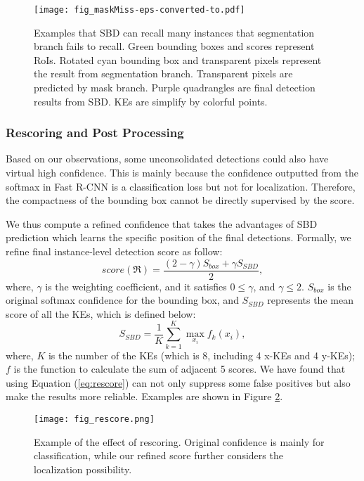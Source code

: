 \documentclass{article}
\begin{document}
\begin{figure}[!t]
  \centering
  \centerline{\texttt{[image: fig\_maskMiss-eps-converted-to.pdf]}}
  \caption{Examples that SBD can recall many instances that segmentation branch fails to recall. Green bounding boxes and scores represent RoIs. Rotated cyan bounding box and transparent pixels represent the result from segmentation branch. Transparent pixels are predicted by mask branch. Purple quadrangles are final detection results from SBD. KEs are simplify by colorful points.}\label{fig:maskMiss}
\end{figure}

\subsubsection{Rescoring and Post Processing}

Based on our observations, some unconsolidated detections could also have virtual high confidence. This is mainly because the confidence outputted from the softmax in Fast R-CNN \cite{girshick2015fast} is a classification loss but not for localization. Therefore, the compactness of the bounding box cannot be directly supervised by the score.

We thus compute a refined confidence that takes the advantages of SBD prediction which learns the specific position of the final detections. Formally, we refine final instance-level detection score as follow:
\begin{equation}\label{eq:rescore}
  score(\Re) = \frac{(2-\gamma)S_{box} + \gamma S_{SBD}}{2},
\end{equation}
where, $\gamma$ is the weighting coefficient, and it satisfies $0\leq\gamma$, and $\gamma\leq2$. $S_{box}$ is the original softmax confidence for the bounding box, and $S_{SBD}$ represents the mean score of all the KEs, which is defined below: 
\begin{equation}\label{eq:sKE}
  S_{SBD} = \frac{1}{K}\sum_{k=1}^{K}\max_{x_{i}}f_{k}(x_{i}),
\end{equation}
where, $K$ is the number of the KEs (which is 8, including 4 x-KEs and 4 y-KEs); $f$ is the function to calculate the sum of adjacent 5 scores. We have found that using Equation (\ref{eq:rescore}) can not only suppress some false positives but also make the results more reliable. Examples are shown in Figure \ref{fig:rescore}.
\begin{figure}[!t]
  \centering
  \centerline{\texttt{[image: fig\_rescore.png]}}
  \caption{Example of the effect of rescoring. Original confidence is mainly for classification, while our refined score further considers the localization possibility.}\label{fig:rescore}
\end{figure}
\end{document}
